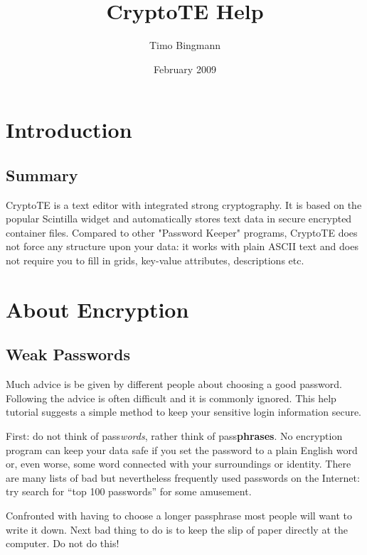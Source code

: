 \documentclass[a4paper,12pt,twoside,draft]{article}
\title{CryptoTE Help}
\author{Timo Bingmann}
\date{February 2009}
\begin{document}
\pagestyle{plain}
\maketitle
\tableofcontents

\clearpage
\pagestyle{fancy}

\section{Introduction}\label{Introduction}

\subsection{Summary}\label{Summary}

CryptoTE is a text editor with integrated strong cryptography. It is based on
the popular Scintilla widget and automatically stores text data in secure
encrypted container files. Compared to other "Password Keeper" programs,
CryptoTE does not force any structure upon your data: it works with plain ASCII
text and does not require you to fill in grids, key-value attributes,
descriptions etc.

\section{About Encryption}\label{AboutEncryption}

\subsection{Weak Passwords}\label{WeakPasswords}

Much advice is be given by different people about choosing a good password. Following the advice is often difficult and it is commonly ignored. This help tutorial suggests a simple method to keep your sensitive login information secure.

First: do not think of pass\emph{words}, rather think of pass\textbf{phrases}. No encryption program can keep your data safe if you set the password to a plain English word or, even worse, some word connected with your surroundings or identity. There are many lists of bad but nevertheless frequently used passwords on the Internet: try search for ``top 100 passwords'' for some amusement.

Confronted with having to choose a longer passphrase most people will want to write it down. Next bad thing to do is to keep the slip of paper directly at the computer. Do not do this!
\end{document}
